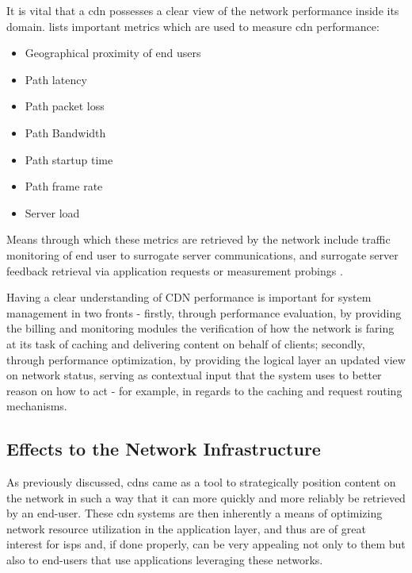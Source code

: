     It is vital that a \gls{cdn} possesses a clear view of the network performance inside its domain.
    \cite{cdn-survey} lists important metrics which are used to measure \gls{cdn} performance:

    \begin{itemize}
        \item Geographical proximity of end users
        \item Path latency
        \item Path packet loss
        \item Path Bandwidth
        \item Path startup time
        \item Path frame rate
        \item Server load
    \end{itemize}

    Means through which these metrics are retrieved by the network include traffic monitoring of end user to surrogate server communications, and surrogate server feedback retrieval via application requests or measurement probings \cite{cdn-survey} \cite{akamai-report}.

    Having a clear understanding of CDN performance is important for system management in two fronts - firstly, through performance evaluation, by providing the billing and monitoring modules the verification of how the network is faring at its task of caching and delivering content on behalf of clients; secondly, through performance optimization, by providing the logical layer an updated view on network status, serving as contextual input that the system uses to better reason on how to act - for example, in regards to the caching and request routing mechanisms.

\subsection{Effects to the Network Infrastructure}

\label{ssec:cdn-effects}

    As previously discussed, \glspl{cdn} came as a tool to strategically position content on the network in such a way that it can more quickly and more reliably be retrieved by an end-user.
    These \gls{cdn} systems are then inherently a means of optimizing network resource utilization in the application layer, and thus are of great interest for \glspl{isp} and, if done properly, can be very appealing not only to them but also to end-users that use applications leveraging these networks.

